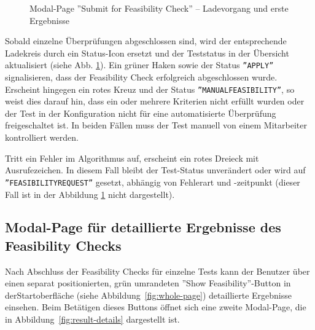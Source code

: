 \begin{figure}[!htbp] 
    \centering 
    \caption{Modal-Page ''Submit for Feasibility Check'' – Ladevorgang und erste Ergebnisse} 
    \label{fig:loading-with-results} 
\end{figure}

Sobald einzelne Überprüfungen abgeschlossen sind, wird der entsprechende Ladekreis durch ein Status-Icon ersetzt und der Teststatus in der Übersicht aktualisiert (siehe Abb. \ref{fig:loading-with-results}). Ein grüner Haken sowie der Status \texttt{''APPLY''} signalisieren, dass der Feasibility Check erfolgreich abgeschlossen wurde. Erscheint hingegen ein rotes Kreuz und der Status \texttt{''MANUALFEASIBILITY''}, so weist dies darauf hin, dass ein oder mehrere Kriterien nicht erfüllt wurden oder der Test in der Konfiguration nicht für eine automatisierte Überprüfung freigeschaltet ist. In beiden Fällen muss der Test manuell von einem Mitarbeiter kontrolliert werden.

Tritt ein Fehler im Algorithmus auf, erscheint ein rotes Dreieck mit Ausrufezeichen. In diesem Fall bleibt der Test-Status unverändert oder wird auf \texttt{''FEASIBILITY\-REQUEST''} gesetzt, abhängig von Fehlerart und -zeitpunkt (dieser Fall ist in der Abbildung \ref{fig:loading-with-results} nicht dargestellt).


\subsection{Modal-Page für detaillierte Ergebnisse des Feasibility Checks}

Nach Abschluss der Feasibility Checks für einzelne Tests kann der Benutzer über einen separat positionierten, grün umrandeten ''Show Feasibility''-Button in der\linebreak Startoberfläche (siehe Abbildung~\ref{fig:whole-page}) detaillierte Ergebnisse einsehen. Beim Betätigen dieses Buttons öffnet sich eine zweite Modal-Page, die in Abbildung~\ref{fig:result-details} dargestellt ist.

